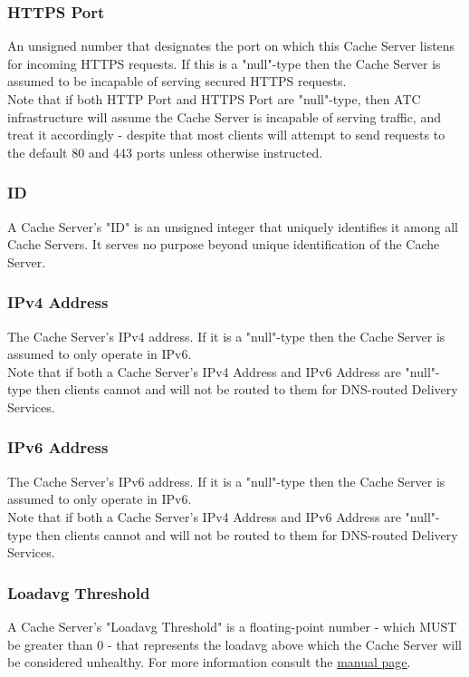 \subsubsection{HTTPS Port}
An unsigned number that designates the port on which this Cache Server listens
for incoming HTTPS requests. If this is a "null"-type then the Cache Server is
assumed to be incapable of serving secured HTTPS requests.\\
Note that if both HTTP Port and HTTPS Port are "null"-type, then ATC
infrastructure will assume the Cache Server is incapable of serving traffic, and
treat it accordingly - despite that most clients will attempt to send requests to
the default 80 and 443 ports unless otherwise instructed.

\subsubsection{ID}
A Cache Server's "ID" is an unsigned integer that uniquely identifies it among
all Cache Servers. It serves no purpose beyond unique identification of the Cache
Server.

\subsubsection{IPv4 Address}
The Cache Server's IPv4 address. If it is a "null"-type then the Cache Server is
assumed to only operate in IPv6.\\
Note that if both a Cache Server's IPv4 Address and IPv6 Address are "null"-type
then clients cannot and will not be routed to them for DNS-routed Delivery
Services.

\subsubsection{IPv6 Address}
The Cache Server's IPv6 address. If it is a "null"-type then the Cache Server is
assumed to only operate in IPv6.\\
Note that if both a Cache Server's IPv4 Address and IPv6 Address are "null"-type
then clients cannot and will not be routed to them for DNS-routed Delivery
Services.

\subsubsection{Loadavg Threshold}
A Cache Server's "Loadavg Threshold" is a floating-point number - which MUST be
greater than 0 - that represents the loadavg above which the Cache Server will be
considered unhealthy. For more information consult the
\href{https://linux.die.net/man/3/getloadavg}{ manual page}.


